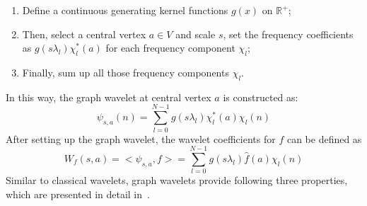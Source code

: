 \begin{enumerate}
\item Define a continuous generating kernel functions $g(x)$ on $\mathbb{R}^+$;
\item Then, select a central vertex $a \in {V}$ and scale $s$, set the frequency coefficients as $g(s\lambda_l)\chi^*_l(a)$ for each frequency component $\chi_l$;
\item Finally, sum up all those frequency components $\chi_l$.
\end{enumerate}
In this way, the graph wavelet at central vertex $a$ is constructed as:
\begin{equation}
\label{eq:graphwaveletdefinition}
\psi_{s,a}(n) = \sum\limits_{l=0}^{N-1}g(s\lambda_l)\chi_l^*(a)\chi_l(n)
\end{equation}
After setting up the graph wavelet, the wavelet coefficients for $f$ can be defined as
\begin{equation}
\label{eq:graph_graphwavelet}
W_f(s,a)=<\psi_{s,a}, f>=\sum\limits_{l=0}^{N-1}g(s\lambda_l)\hat{f}(a)\chi_l(n)
\end{equation}
Similar to classical wavelets, graph wavelets provide following three properties, which are presented in detail in~\cite{hammond2011wavelets}.
